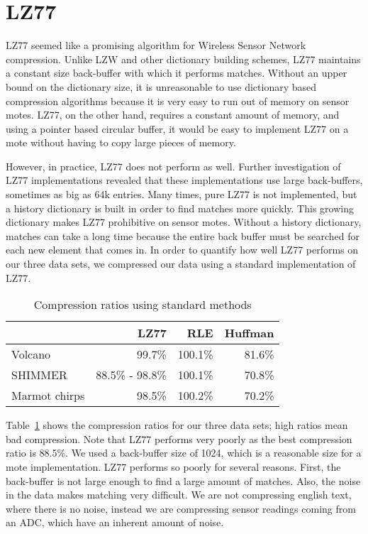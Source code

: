 \section{LZ77}
\label{sec-lz77}

LZ77 \cite{lz77} seemed like a promising algorithm for Wireless Sensor
Network compression. Unlike LZW \cite{lzw} and other dictionary
building schemes, LZ77 maintains a constant size back-buffer with
which it performs matches. Without an upper bound on the dictionary
size, it is unreasonable to use dictionary based compression
algorithms because it is very easy to run out of memory on sensor
motes. LZ77, on the other hand, requires a constant amount of memory,
and using a pointer based circular buffer, it would be easy to
implement LZ77 on a mote without having to copy large pieces of
memory.

However, in practice, LZ77 does not perform as well. Further
investigation of LZ77 implementations revealed that these
implementations use large back-buffers, sometimes as big as 64k
entries. Many times, pure LZ77 is not implemented, but a history
dictionary is built in order to find matches more quickly. This
growing dictionary makes LZ77 prohibitive on sensor motes. Without a
history dictionary, matches can take a long time because the entire
back buffer must be searched for each new element that comes in. In
order to quantify how well LZ77 performs on our three data sets, we
compressed our data using a standard implementation of LZ77.

\begin{table}
  \begin{center}
  \begin{tabular}{|l||r|r|r|}
    \hline
    & LZ77 & RLE & Huffman \\ \hline
    Volcano & 99.7\% & 100.1\% & 81.6\% \\ \hline
    SHIMMER & 88.5\% - 98.8\% & 100.1\% & 70.8\% \\ \hline
    Marmot chirps & 98.5\% & 100.2\% & 70.2\% \\ \hline
    
  \end{tabular}
  \end{center}
  \caption{Compression ratios using standard methods}
  \label{table:compratios}
\end{table}

Table~\ref{table:compratios} shows the compression ratios for our
three data sets; high ratios mean bad compression. Note that LZ77
performs very poorly as the best compression ratio is 88.5\%. We used
a back-buffer size of 1024, which is a reasonable size for a mote
implementation. LZ77 performs so poorly for several reasons. First,
the back-buffer is not large enough to find a large amount of
matches. Also, the noise in the data makes matching very difficult. We
are not compressing english text, where there is no noise, instead we
are compressing sensor readings coming from an ADC, which have an
inherent amount of noise.

